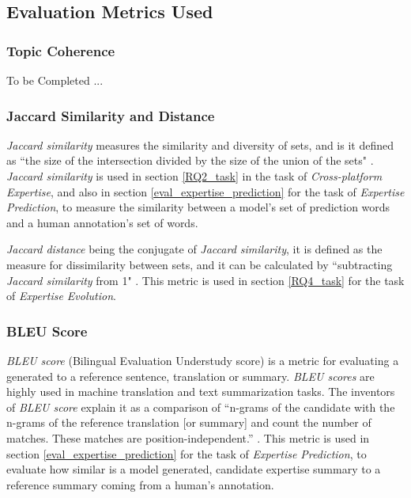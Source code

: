     
    \subsection{Evaluation Metrics Used \label{background:metrics}}
        
        \subsubsection{Topic Coherence\label{background:T_coherence}}
            To be Completed ...
            
        
        \subsubsection{Jaccard Similarity and Distance\label{background:jaccard}}
            \emph{Jaccard similarity} measures the similarity and diversity of sets, and is it defined as ``the size of the intersection divided by the size of the union of the sets" \cite{jaccard_wiki}. \emph{Jaccard similarity} is used in section \ref{RQ2_task} in the task of \emph{Cross-platform Expertise}, and also in section \ref{eval_expertise_prediction} for the task of \emph{Expertise Prediction}, to measure the similarity between a model's set of prediction words and a human annotation's set of words.
            
            \emph{Jaccard distance} being the conjugate of \emph{Jaccard similarity}, it is defined as the measure for dissimilarity between sets, and it can be calculated by ``subtracting \emph{Jaccard similarity} from 1" \cite{jaccard_wiki}. This metric is used in section \ref{RQ4_task} for the task of \emph{Expertise Evolution}.
        
        \subsubsection{BLEU Score}
            \emph{BLEU score} (Bilingual Evaluation Understudy score) is a metric for evaluating a generated to a reference sentence, translation or summary. \emph{BLEU scores} are highly used in machine translation and text summarization tasks. The inventors of \emph{BLEU score} explain it as a comparison of ``n-grams of the candidate with the n-grams of the reference translation [or summary] and count the number of matches. These matches are position-independent.'' \cite{papineni2002bleu}. This metric is used in section \ref{eval_expertise_prediction} for the task of \emph{Expertise Prediction}, to evaluate how similar is a model generated, candidate expertise summary to a reference summary coming from a human's annotation.
        
